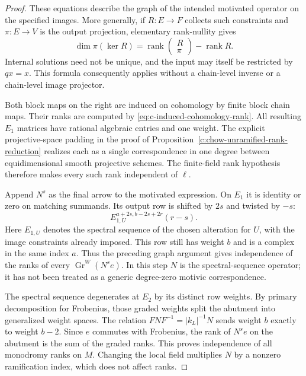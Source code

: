 \begin{proof}
These equations describe the graph of the intended motivated
operator on the specified images. More generally, if $R:E\to F$
collects such constraints and $\pi:E\to V$ is the output
projection, elementary rank-nullity gives
\[
       \dim\pi(\ker R)
       =\operatorname{rank}\begin{pmatrix}R\\\pi\end{pmatrix}
          -\operatorname{rank}R.
\]
Internal solutions need not be unique, and the input may itself
be restricted by $q x=x$. This formula consequently applies
without a chain-level inverse or a chain-level image projector.

Both block maps on the right are induced on cohomology by
finite block chain maps. Their ranks are computed by
\eqref{eq:c-induced-cohomology-rank}.
All resulting $E_1$ matrices have rational algebraic entries and
one weight. The explicit projective-space padding in the proof of
Proposition~\ref{c:chow-unramified-rank-reduction} realizes each
as a single correspondence in one degree between equidimensional
smooth projective schemes. The finite-field rank hypothesis
therefore makes every such rank independent of $\ell$.

Append $N^s$ as the final arrow to the motivated expression.
On $E_1$ it is identity or zero on matching summands. Its output
row is shifted by $2s$ and twisted by $-s$:
\[
           E_{1,U}^{a+2s,b-2s+2r}(r-s).
\]
Here $E_{1,U}$ denotes the spectral sequence of the chosen
alteration for $U$, with the image constraints already imposed.
This row still has weight $b$ and is a complex in the same
index $a$. Thus the preceding graph argument gives independence
of the ranks of every $\operatorname{Gr}^W(N^s e)$.
In this step $N$ is the spectral-sequence operator; it has not
been treated as a generic degree-zero motivic correspondence.

The spectral sequence degenerates at $E_2$ by its distinct
row weights. By primary decomposition for Frobenius, those
graded weights split the abutment into generalized weight spaces.
The relation $FNF^{-1}=|k_L|^{-1}N$ sends weight $b$ exactly to
weight $b-2$. Since $e$ commutes with Frobenius, the rank of
$N^s e$ on the abutment is the sum of the graded ranks.
This proves independence of all monodromy ranks on $M$.
Changing the local field multiplies $N$ by a nonzero ramification
index, which does not affect ranks.


\end{proof}
